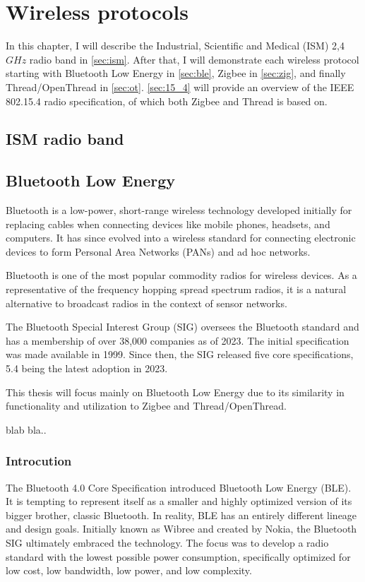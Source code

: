 \chapter{Wireless protocols}
\label{chap:wireless}

In this chapter, I will describe the Industrial, Scientific and Medical (ISM) 2,4 \(GHz\) radio band in \autoref{sec:ism}.
After that, I will demonstrate each wireless protocol starting with Bluetooth Low Energy in \autoref{sec:ble},
Zigbee in \autoref{sec:zig}, and finally Thread/OpenThread in \autoref{sec:ot}.
\autoref{sec:15_4} will provide an overview of the IEEE 802.15.4 radio specification, of which both Zigbee and Thread is based on.

\section{ISM radio band}
\label{sec:ism}

\section{Bluetooth Low Energy}
\label{sec:ble}

Bluetooth is a low-power, short-range wireless technology developed initially for replacing cables when
connecting devices like mobile phones, headsets, and computers.
It has since evolved into a wireless standard for connecting electronic devices to
form Personal Area Networks (PANs) and ad hoc networks. \cite{Dideles03}

Bluetooth is one of the most popular commodity radios for wireless devices.
As a representative of the frequency hopping spread spectrum radios,
it is a natural alternative to broadcast radios in the context of sensor networks. \cite{Leopold03}

The Bluetooth Special Interest Group (SIG) oversees
the Bluetooth standard and has a membership of over 38,000 companies as of 2023. \cite{bt_history}
The initial specification was made available in 1999.
Since then, the SIG released five core specifications, 5.4 being the latest adoption in 2023. \cite{bt_spec_history}

This thesis will focus mainly on Bluetooth Low Energy due to
its similarity in functionality and utilization to Zigbee and Thread/OpenThread.

blab bla.\cite{ble_primer23}.

\subsection{Introcution}
\label{ble:int}
The Bluetooth 4.0 Core Specification introduced Bluetooth Low Energy (BLE).
It is tempting to represent itself as a smaller and highly optimized version of
its bigger brother, classic Bluetooth. In reality, BLE has an entirely different lineage and design goals.
Initially known as Wibree and created by Nokia, the Bluetooth SIG ultimately embraced the technology.
The focus was to develop a radio standard with the lowest possible power consumption,
specifically optimized for low cost, low bandwidth, low power, and low complexity. \cite{Townsend14}


